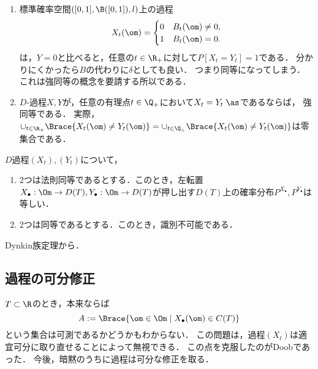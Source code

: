 \documentclass[uplatex,dvipdfmx]{jsreport}
\begin{document}
\begin{example}\mbox{}
    \begin{enumerate}
        \item 標準確率空間$([0,1],\B([0,1]),l)$上の過程
        \[X_t(\om)=\begin{cases}
            0&B_t(\om)\ne0,\\
            1&B_t(\om)=0.
        \end{cases}\]
        は，$Y=0$と比べると，任意の$t\in\R_+$に対して$P[X_t=Y_t]=1$である．
        分かりにくかったら$B$の代わりに$\delta$としても良い．
        つまり同等になってしまう．これは強同等の概念を要請する所以である．
        \item $D$-過程$X,Y$が，任意の有理点$t\in\Q_+$において$X_t=Y_t\;\as$であるならば，
        強同等である．
        実際，$\cup_{t\in\R_+}\Brace{X_t(\om)\ne Y_t(\om)}=\cup_{t\in\Q_+}\Brace{X_t(\om)\ne Y_t(\om)}$は零集合である．
    \end{enumerate}
\end{example}

\begin{theorem}[$D$-過程の有限周辺分布が等しいなら分布全体は等しい]
    $D$過程$(X_t),(Y_t)$について，
    \begin{enumerate}
        \item 2つは法則同等であるとする．このとき，左転置$X_\bullet:\Om\to D(T),Y_\bullet:\Om\to D(T)$が押し出す$D(T)$上の確率分布$P^{X_\bullet},P^{Y_\bullet}$は等しい．
        \item 2つは同等であるとする．このとき，識別不可能である\cite{Nualart-Introduction}．
    \end{enumerate}
\end{theorem}
\begin{Proof}
    Dynkin族定理から．
\end{Proof}

\subsection{過程の可分修正}

\begin{tcolorbox}[colframe=ForestGreen, colback=ForestGreen!10!white,breakable,colbacktitle=ForestGreen!40!white,coltitle=black,fonttitle=\bfseries\sffamily,
title=]
    $T\subset\R$のとき，本来ならば
    \[A:=\Brace{\om\in\Om\mid X_\bullet(\om)\in C(T)}\]
    という集合は可測であるかどうかもわからない．
    この問題は，過程$(X_t)$は適宜可分に取り直せることによって無視できる．
    この点を克服したのがDoobであった．
    今後，暗黙のうちに過程は可分な修正を取る．
\end{tcolorbox}
\end{document}
